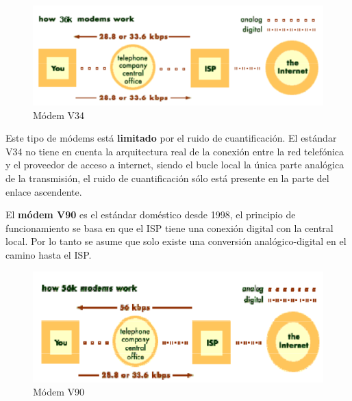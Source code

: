 \documentclass[10pt,portrait, twocolumn]{article}
\makeatletter
\renewcommand{\subsubsection}{\@startsection{subsubsection}{3}{0mm}%
                                {-1ex plus -.5ex minus -.2ex}%
                                {1ex plus .2ex}%
                                {\normalfont\small\bfseries}}
\makeatother
\begin{document}

	\begin{figure}[!ht]
 		\centering
  		 \includegraphics[scale = 0.25]{images/ModemV34}
		\caption{Módem V34}
	\end{figure}

Este tipo de módems está \textbf{limitado} por el ruido de cuantificación. El estándar V34 no tiene en cuenta la arquitectura real de la conexión entre la red telefónica y el proveedor de acceso a internet, siendo el bucle local la única parte analógica de la transmisión, el ruido de cuantificación sólo está presente en la parte del enlace ascendente.


El \textbf{módem V90} es el estándar doméstico desde 1998, el principio de funcionamiento se basa en que el ISP tiene una conexión digital con la central local. Por lo tanto se asume que solo existe una conversión analógico-digital en el camino hasta el ISP.


	\begin{figure}[!ht]
 		\centering
  		 \includegraphics[scale = 0.25]{images/ModemV90}
		\caption{Módem V90}
	\end{figure}
\end{document}
